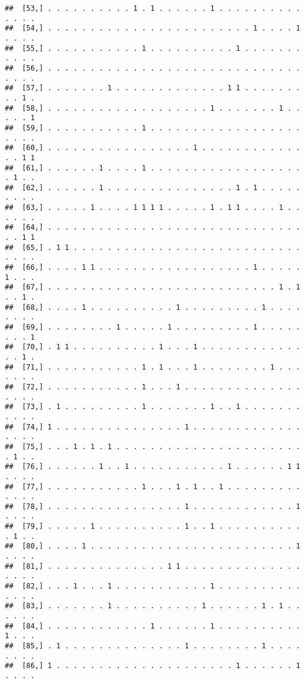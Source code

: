 \documentclass{article}\usepackage[]{graphicx}\usepackage[]{color}
\makeatletter
\newenvironment{kframe}{%
 \def\at@end@of@kframe{}%
 \ifinner\ifhmode%
  \def\at@end@of@kframe{\end{minipage}}%
  \begin{minipage}{\columnwidth}%
 \fi\fi%
 \def\FrameCommand##1{\hskip\@totalleftmargin \hskip-\fboxsep
 \colorbox{shadecolor}{##1}\hskip-\fboxsep
     \hskip-\linewidth \hskip-\@totalleftmargin \hskip\columnwidth}%
 \MakeFramed {\advance\hsize-\width
   \@totalleftmargin\z@ \linewidth\hsize
   \@setminipage}}%
 {\par\unskip\endMakeFramed%
 \at@end@of@kframe}
\newenvironment{knitrout}{}{} %
\makeatother
\begin{document}
\begin{knitrout}
\begin{kframe}
\begin{verbatim}
##  [53,] . . . . . . . . . . 1 . 1 . . . . . . 1 . . . . . . . . . . . . . .
##  [54,] . . . . . . . . . . . . . . . . . . . . . . . . 1 . . . . 1 . . . .
##  [55,] . . . . . . . . . . . 1 . . . . . . . . . . 1 . . . . . . . . . . .
##  [56,] . . . . . . . . . . . . . . . . . . . . . . . . . . . . . . . . . .
##  [57,] . . . . . . . 1 . . . . . . . . . . . . . 1 1 . . . . . . . . . 1 .
##  [58,] . . . . . . . . . . . . . . . . . . . 1 . . . . . . . 1 . . . . . 1
##  [59,] . . . . . . . . . . . 1 . . . . . . . . . . . . . . . . . . . . . .
##  [60,] . . . . . . . . . . . . . . . . . 1 . . . . . . . . . . . . . . 1 1
##  [61,] . . . . . . 1 . . . . 1 . . . . . . . . . . . . . . . . . . . 1 . .
##  [62,] . . . . . . 1 . . . . . . . . . . . . . . . 1 . 1 . . . . . . . . .
##  [63,] . . . . . 1 . . . . 1 1 1 1 . . . . . 1 . 1 1 . . . . 1 . . . . . .
##  [64,] . . . . . . . . . . . . . . . . . . . . . . . . . . . . . . . . 1 1
##  [65,] . 1 1 . . . . . . . . . . . . . . . . . . . . . . . . . . . . . . .
##  [66,] . . . . 1 1 . . . . . . . . . . . . . . . . . . 1 . . . . . 1 . . .
##  [67,] . . . . . . . . . . . . . . . . . . . . . . . . . . . 1 . 1 . . 1 .
##  [68,] . . . . 1 . . . . . . . . . . 1 . . . . . . . . . 1 . . . . . . . .
##  [69,] . . . . . . . . 1 . . . . . 1 . . . . . . . . . 1 . . . . . . . . 1
##  [70,] . 1 1 . . . . . . . . . . 1 . . . 1 . . . . . . . . . . . . . . 1 .
##  [71,] . . . . . . . . . . . 1 . 1 . . . 1 . . . . . . . . 1 . . . . . . .
##  [72,] . . . . . . . . . . . 1 . . . 1 . . . . . . . . . . . . . . . . . .
##  [73,] . 1 . . . . . . . . . 1 . . . . . . . 1 . . 1 . . . . . . . . . . .
##  [74,] 1 . . . . . . . . . . . . . . . 1 . . . . . . . . . . . . . . . . .
##  [75,] . . . 1 . 1 . 1 . . . . . . . . . . . . . . . . . . . . . . . 1 . .
##  [76,] . . . . . . 1 . . 1 . . . . . . . . . . . 1 . . . . . . 1 1 . . . .
##  [77,] . . . . . . . . . . . 1 . . . 1 . 1 . . 1 . . . . . . . . . . . . .
##  [78,] . . . . . . . . . . . . . . . . 1 . . . . . . . . . . . . 1 . . . .
##  [79,] . . . . . 1 . . . . . . . . . . 1 . . 1 . . . . . . . . . . . 1 . .
##  [80,] . . . . 1 . . . . . . . . . . . . . . . . . . . . . . . . 1 . . . .
##  [81,] . . . . . . . . . . . . . . 1 1 . . . . . . . . . . . . . . . . . .
##  [82,] . . . 1 . . . 1 . . . . . . . . . . . 1 . . . . . . . . . . . . . .
##  [83,] . . . . . . . 1 . . . . . . . . . . 1 . . . . . . 1 . 1 . . . . . .
##  [84,] . . . . . . . . . . . . 1 . . . . . . 1 . . . . . . . . . . 1 . . .
##  [85,] . 1 . . . . . . . . . . . . . . 1 . . . . . . . . 1 . . . . . . . .
##  [86,] 1 . . . . . . . . . . . . . . . . . . . . . 1 . . . . . . 1 . . . .

\end{verbatim}
\end{kframe}
\end{knitrout}
\end{document}
